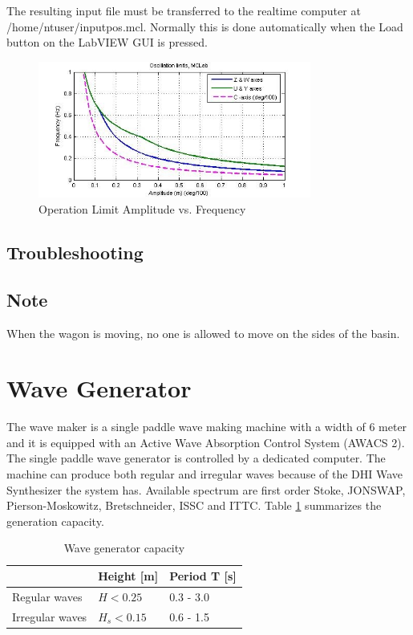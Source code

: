 \documentclass[a4paper,english]{report}
\begin{document}
The resulting input file must be transferred to the realtime computer at /home/ntuser/inputpos.mcl. Normally this is done automatically when the Load button on the LabVIEW GUI is pressed. 

\begin{figure}[htb!]
	\centering \includegraphics[width=0.8\textwidth]{fig/towing_ampvsfreq}
	\caption{\label{fig: Towing main-1-1}Operation Limit Amplitude vs. Frequency}
\end{figure}
\subsection{Troubleshooting}
\subsection{Note}
When the wagon is moving, no one is allowed to move on the sides of the basin.
\clearpage{}

\section{Wave Generator}\label{sec:wave_generator}
The wave maker is a single paddle wave making machine with a width of 6 meter and it is equipped with an Active Wave Absorption Control System (AWACS 2). The single paddle wave generator is controlled by a dedicated computer. The machine can produce both regular and irregular waves because of the DHI Wave Synthesizer the system has. Available spectrum are first order Stoke, JONSWAP, Pierson-Moskowitz, Bretschneider, ISSC and ITTC. Table \ref{tab:Wave generator capacity-1} summarizes the generation capacity.
\begin{table}[h!]
	\centering{}
	\begin{tabular}{lll}
		\hline 
		& Height {[}m{]} & Period T {[}s{]}\tabularnewline
		\hline 
		Regular waves & $H<0.25$ & 0.3 - 3.0\tabularnewline
		Irregular waves & \textbf{$H_{s}<0.15$} & 0.6 - 1.5\tabularnewline
		\hline 
	\end{tabular}\caption{\label{tab:Wave generator capacity-1}Wave generator capacity}
\end{table}
\end{document}
